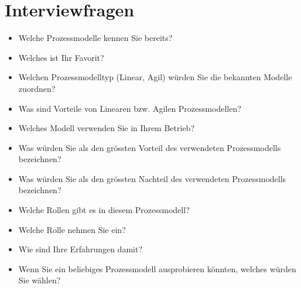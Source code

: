 \chapter{Interviewfragen}
\thispagestyle{fancy}

\begin{itemize}
\item Welche Prozessmodelle kennen Sie bereits?
\item Welches ist Ihr Favorit?
\item Welchen Prozessmodelltyp (Linear, Agil) würden Sie die bekannten Modelle zuordnen?
\item Was sind Vorteile von Linearen bzw. Agilen Prozessmodellen?
\item Welches Modell verwenden Sie in Ihrem Betrieb?
\item Was würden Sie als den grössten Vorteil des verwendeten Prozessmodells bezeichnen?
\item Was würden Sie als den grössten Nachteil des verwendeten Prozessmodells bezeichnen?
\item Welche Rollen gibt es in diesem Prozessmodell?
\item Welche Rolle nehmen Sie ein?
\item Wie sind Ihre Erfahrungen damit?
\item Wenn Sie ein beliebiges Prozessmodell ausprobieren könnten, welches würden Sie wählen?
\end{itemize}